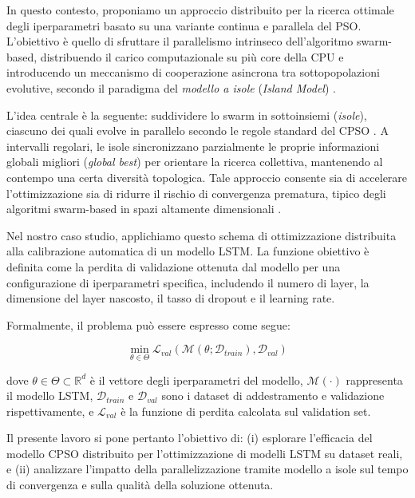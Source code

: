 \documentclass{article}
\begin{document}
In questo contesto, proponiamo un approccio distribuito per la ricerca ottimale degli iperparametri 
basato su una variante continua e parallela del PSO. L'obiettivo è quello di sfruttare il parallelismo 
intrinseco dell'algoritmo swarm-based, distribuendo il carico computazionale su più core della CPU e 
introducendo un meccanismo di cooperazione asincrona tra sottopopolazioni evolutive, secondo il 
paradigma del \textit{modello a isole} (\textit{Island Model}) \cite{cantupaz1998survey, tomassini2005spatially}.

L'idea centrale è la seguente: suddividere lo swarm in sottoinsiemi (\textit{isole}), 
ciascuno dei quali evolve in parallelo secondo le regole standard del CPSO \cite{professoressa}. 
A intervalli regolari, le isole sincronizzano parzialmente le proprie informazioni globali migliori 
(\textit{global best}) per orientare la ricerca collettiva, mantenendo al contempo una certa diversità 
topologica. Tale approccio consente sia di accelerare l'ottimizzazione sia di ridurre il rischio di 
convergenza prematura, tipico degli algoritmi swarm-based in spazi altamente dimensionali \cite{omran2005dynamic}.

Nel nostro caso studio, applichiamo questo schema di ottimizzazione distribuita alla calibrazione 
automatica di un modello LSTM. La funzione obiettivo è definita come la perdita di validazione ottenuta 
dal modello per una configurazione di iperparametri specifica, includendo il numero di layer, la 
dimensione del layer nascosto, il tasso di dropout e il learning rate.

Formalmente, il problema può essere espresso come segue:

\begin{equation}
\min_{\theta \in \Theta} \mathcal{L}_{val}(\mathcal{M}(\theta; \mathcal{D}_{train}), \mathcal{D}_{val})
\end{equation}

dove $\theta \in \Theta \subset \mathbb{R}^d$ è il vettore degli iperparametri del modello, $\mathcal{M}(\cdot)$ rappresenta il modello LSTM, $\mathcal{D}_{train}$ e $\mathcal{D}_{val}$ sono i dataset di addestramento e validazione rispettivamente, e $\mathcal{L}_{val}$ è la funzione di perdita calcolata sul validation set.

Il presente lavoro si pone pertanto l'obiettivo di: (i) esplorare l’efficacia del modello CPSO 
distribuito per l’ottimizzazione di modelli LSTM su dataset reali, e (ii) analizzare l’impatto della 
parallelizzazione tramite modello a isole sul tempo di convergenza e sulla qualità della soluzione 
ottenuta.
\end{document}
